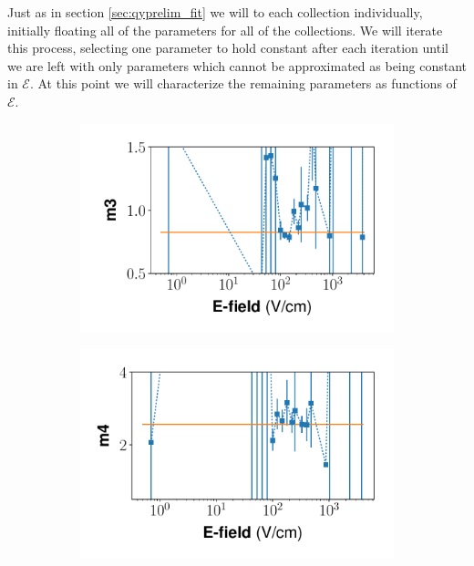 Just as in section \ref{sec:qyprelim_fit} we will to each collection individually, initially floating all of the parameters for all of the collections. We will iterate this process, selecting one parameter to hold constant after each iteration until we are left with only parameters which cannot be approximated as being constant in $\mathcal{E}$. At this point we will characterize the remaining parameters as functions of $\mathcal{E}$.
\begin{figure}[!h]
\centering
\begin{subfigure}{0.33\linewidth}
  \includegraphics[width=\textwidth]{Figures/Yields_fit_new/NEST_m3_fit_new.pdf}
  \caption{}
\end{subfigure}%
\begin{subfigure}{0.33\linewidth}
  \includegraphics[width=\textwidth]{Figures/Yields_fit_new/NEST_m4_fit_new.pdf}
  \caption{}
\end{subfigure}%

\end{figure}
